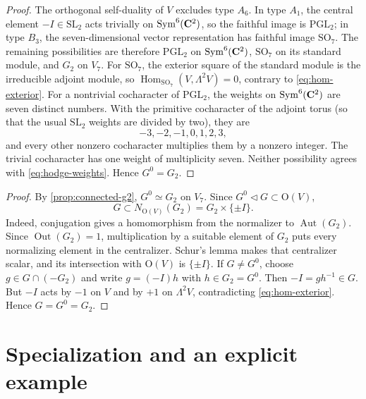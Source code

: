 \begin{proof}
The orthogonal self-duality of $V$ excludes type $A_6$.  In type $A_1$, the
central element $-I\in\mathrm{SL}_2$ acts trivially on $\operatorname{Sym}^6(\mathbf C^2)$,
so the faithful image is $\mathrm{PGL}_2$; in type $B_3$, the
seven-dimensional vector representation has faithful image $\mathrm{SO}_7$.
The remaining possibilities are therefore $\mathrm{PGL}_2$ on
$\operatorname{Sym}^6(\mathbf C^2)$, $\mathrm{SO}_7$ on its standard module, and $G_2$ on
$V_7$.  For $\mathrm{SO}_7$, the exterior
square of the standard module is the irreducible adjoint module, so
$\operatorname{Hom}_{\mathrm{SO}_7}(V,\Lambda^2V)=0$, contrary to
\eqref{eq:hom-exterior}.  For a nontrivial cocharacter of $\mathrm{PGL}_2$, the weights on
$\operatorname{Sym}^6(\mathbf C^2)$ are seven distinct numbers.  With the primitive
cocharacter of the adjoint torus (so that the usual $\mathrm{SL}_2$ weights
are divided by two), they are
\[
 -3,-2,-1,0,1,2,3,
\]
and every other nonzero cocharacter multiplies them by a nonzero integer.
The trivial cocharacter has one weight of multiplicity seven.  Neither
possibility agrees with \eqref{eq:hodge-weights}.  Hence $G^0=G_2$.
\end{proof}


\begin{proof}
By \cref{prop:connected-g2}, $G^0\simeq G_2$ on $V_7$.  Since
$G^0\mathrel{\triangleleft}G\subset \mathrm{O}(V)$,
\[
 G\subset N_{\mathrm{O}(V)}(G_2)=G_2\times\{\pm I\}.
\]
Indeed, conjugation gives a homomorphism from the normalizer to
$\operatorname{Aut}(G_2)$.  Since $\operatorname{Out}(G_2)=1$, multiplication
by a suitable element of $G_2$ puts every normalizing element in the
centralizer.  Schur's lemma makes that centralizer scalar, and its intersection
with $\mathrm{O}(V)$ is $\{\pm I\}$.  If $G\ne G^0$, choose
$g\in G\cap(-G_2)$ and write $g=(-I)h$ with $h\in G_2=G^0$.  Then
$-I=gh^{-1}\in G$.  But $-I$ acts by $-1$ on $V$ and by $+1$ on
$\Lambda^2V$, contradicting \eqref{eq:hom-exterior}.  Hence $G=G^0=G_2$.
\end{proof}

\section{Specialization and an explicit example}

